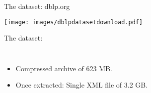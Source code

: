 \documentclass[aspectratio = 169, 15pt, trans]{beamer}
\begin{document}
    \begin{frame}{The dataset: dblp.org}
        \begin{center}
            \vspace*{-0.1cm}
            \texttt{[image: images/dblpdatasetdownload.pdf]}
        \end{center}
        
        \vspace*{-0.3cm}
        {\color{darkgray}The dataset:}
        \begin{columns}[t]
                \vspace*{-0.6cm}
                \begin{itemize}
                	\item Compressed archive of 623 MB.
                	\item Once extracted: Single XML file of 3.2 GB.
                \end{itemize}
                

\end{columns}
\end{frame}
\end{document}
